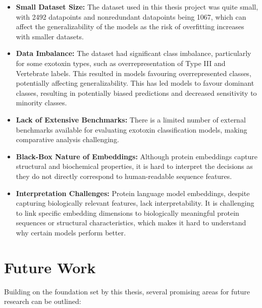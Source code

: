 \begin{itemize}
	
	\item \textbf{Small Dataset Size:} The dataset used in this thesis project was quite small, with 2492 datapoints and nonredundant datapoints being 1067, which can affect the generalizability of the models as the risk of overfitting increases with smaller datasets.
	
	\item \textbf{Data Imbalance:} The dataset had significant class imbalance, particularly for some exotoxin types, such as overrepresentation of Type III and Vertebrate labels. This resulted in models favouring overrepresented classes, potentially affecting generalizability. This has led models to favour dominant classes, resulting in potentially biased predictions and decreased sensitivity to minority classes.
	
	\item \textbf{Lack of Extensive Benchmarks:} There is a limited number of external benchmarks available for evaluating exotoxin classification models, making comparative analysis challenging.
	
	\item \textbf{Black-Box Nature of Embeddings:} Although protein embeddings capture structural and biochemical properties, it is hard to interpret the decisions as they do not directly correspond to human-readable sequence features.
	
	\item \textbf{Interpretation Challenges:}  Protein language model embeddings, despite capturing biologically relevant features, lack interpretability. It is challenging to link specific embedding dimensions to biologically meaningful protein sequences or structural characteristics, which makes it hard to understand why certain models perform better.
\end{itemize}


\pagebreak 
\section{Future Work}
Building on the foundation set by this thesis, several promising areas for future research can be outlined:

